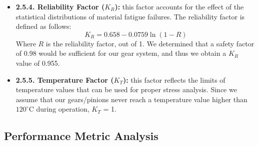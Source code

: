 \documentclass[letterpaper,12pt]{article}
\begin{document}
\begin{itemize}[leftmargin=3mm]
    \item \textbf{2.5.4. Reliability Factor ($K_R$):} this factor accounts for the effect of the statistical distributions of material fatigue failures. The reliability factor is defined as follows:
    \begin{equation}
    K_R = 0.658-0.0759\ln{(1-R)}
    \end{equation}
    Where $R$ is the reliability factor, out of 1. We determined that a safety factor of 0.98 would be sufficient for our gear system, and thus we obtain a $K_R$ value of 0.955.
    
    \item \textbf{2.5.5. Temperature Factor ($K_T$):} this factor reflects the limits of temperature values that can be used for proper stress analysis. Since we assume that our gears/pinions never reach a temperature value higher than $120^\circ$C during operation, $K_T$ = 1.
\end{itemize}

\subsection{Performance Metric Analysis}
\end{document}
